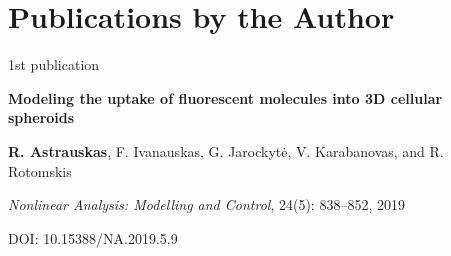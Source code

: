 {}	

	

\chapter*{Publications by the Author}
\label{cha:publications} 


{}



\vspace*{15mm}

\begin{center}

{\huge 1st publication}
\vspace{10mm}

{\Large \bf Modeling the uptake of fluorescent molecules into 3D cellular spheroids}

\vspace{5mm}
\textbf{R. Astrauskas}, F. Ivanauskas, G. Jarockytė, V. Karabanovas, and R. Rotomskis

\vspace{5mm}
\textit{Nonlinear Analysis: Modelling and Control}, 24(5): 838--852, 2019


\vspace{3mm}
DOI: 10.15388/NA.2019.5.9

\end{center}

\newpage

